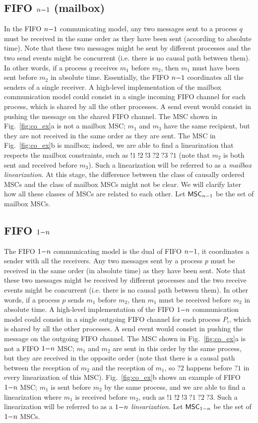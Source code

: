 \subsection{FIFO $n\mathsf{-}1$ (mailbox)}
In the FIFO $n\mathsf{-}1$ communicating model, any two messages sent to a process $q$ must be received in the same order as they have been sent (according to absolute time). Note that these two messages might be sent by different processes and the two send events might be concurrent (i.e. there is no causal path between them). In other words, if a process $q$ receives $m_1$ before $m_2$, then $m_1$ must have been sent before $m_2$ in absolute time. Essentially, the FIFO $n\mathsf{-}1$ coordinates all the senders of a single receiver. A high-level implementation of the mailbox communication model could consist in a single incoming FIFO channel for each process, which is shared by all the other processes. A send event would consist in pushing the message on the shared FIFO channel. The MSC shown in Fig.~\ref{fig:co_ex}a is not a mailbox MSC; $m_1$ and $m_3$ have the same recipient, but they are not received in the same order as they are sent. The MSC in Fig.~\ref{fig:co_ex}b is mailbox; indeed, we are able to find a linearization that respects the mailbox constraints, such as $!1\;!2\;!3\;?2\;?3\;?1$ (note that $m_2$ is both sent and received before $m_3$). Such a linearization will be referred to as a \emph{mailbox linearization}. At this stage, the difference between the class of causally ordered MSCs and the class of mailbox MSCs might not be clear. We will clarify later how all these classes of MSCs are related to each other. Let $\mathsf{MSC}_{n\mathsf{-}1}$ be the set of mailbox MSCs.

\subsection{FIFO $1\mathsf{-}n$}
The FIFO $1\mathsf{-}n$ communicating model is the dual of FIFO $n\mathsf{-}1$, it coordinates a sender with all the receivers. Any two messages sent by a process $p$ must be received in the same order (in absolute time) as they have been sent. Note that these two messages might be received by different processes and the two receive events might be concurrent (i.e. there is no causal path between them). In other words, if a process $p$ sends $m_1$ before $m_2$, then $m_1$ must be received before $m_2$ in absolute time. A high-level implementation of the FIFO $1\mathsf{-}n$ communication model could consist in a single outgoing FIFO channel for each process $P_i$, which is shared by all the other processes. A send event would consist in pushing the message on the outgoing FIFO channel. The MSC shown in Fig.~\ref{fig:co_ex}a is not a FIFO $1\mathsf{-}n$ MSC; $m_1$ and $m_2$ are sent in this order by the same process, but they are received in the opposite order (note that there is a causal path between the reception of $m_2$ and the reception of $m_1$, so $?2$ happens before $?1$ in every linearization of this MSC). Fig.~\ref{fig:co_ex}b shows an example of FIFO $1\mathsf{-}n$ MSC; $m_1$ is sent before $m_2$ by the same process, and we are able to find a linearization where $m_1$ is received before $m_2$, such as $!1\;!2\;!3\;?1\;?2\;?3$. Such a linearization will be referred to as a \emph{$1\mathsf{-}n$ linearization}. Let $\mathsf{MSC}_{1\mathsf{-}n}$ be the set of $1\mathsf{-}n$ MSCs.

